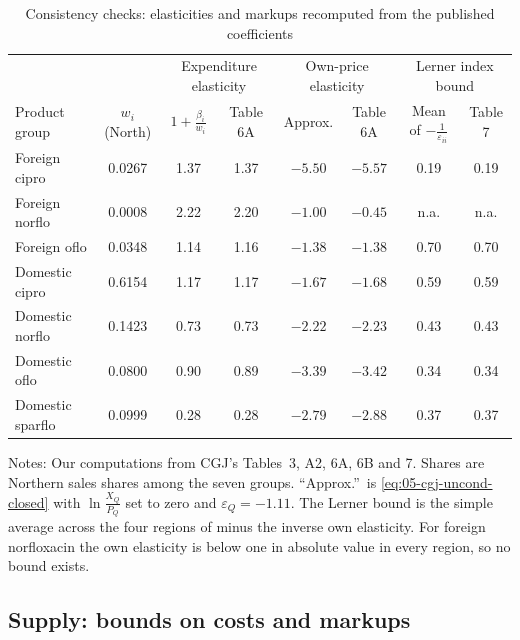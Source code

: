 \begin{table}[htbp]
\centering
\caption{Consistency checks: elasticities and markups recomputed from the published coefficients}\label{tab:05-cgj-checks}
\footnotesize
\setlength{\tabcolsep}{5pt}
\begin{tabular}{lccccccc}
\toprule
 & & \multicolumn{2}{c}{Expenditure elasticity} & \multicolumn{2}{c}{Own-price elasticity} & \multicolumn{2}{c}{Lerner index bound} \\
\cmidrule(lr){3-4}\cmidrule(lr){5-6}\cmidrule(lr){7-8}
Product group & \makecell{$w_i$\\ (North)} & $1 + \frac{\beta_i}{w_i}$ & Table 6A & Approx. & Table 6A &
\makecell{Mean of\\ $-\frac{1}{\varepsilon_{ii}}$} & Table 7 \\
\midrule
Foreign cipro & 0.0267 & 1.37 & 1.37 & $-5.50$ & $-5.57$ & 0.19 & 0.19 \\
Foreign norflo & 0.0008 & 2.22 & 2.20 & $-1.00$ & $-0.45$ & n.a. & n.a. \\
Foreign oflo & 0.0348 & 1.14 & 1.16 & $-1.38$ & $-1.38$ & 0.70 & 0.70 \\
Domestic cipro & 0.6154 & 1.17 & 1.17 & $-1.67$ & $-1.68$ & 0.59 & 0.59 \\
Domestic norflo & 0.1423 & 0.73 & 0.73 & $-2.22$ & $-2.23$ & 0.43 & 0.43 \\
Domestic oflo & 0.0800 & 0.90 & 0.89 & $-3.39$ & $-3.42$ & 0.34 & 0.34 \\
Domestic sparflo & 0.0999 & 0.28 & 0.28 & $-2.79$ & $-2.88$ & 0.37 & 0.37 \\
\bottomrule
\end{tabular}
\par\smallskip
\begin{minipage}{0.95\textwidth}\footnotesize
Notes: Our computations from CGJ's Tables~3, A2, 6A, 6B and 7. Shares are Northern sales shares among the seven
groups. ``Approx.''\ is \eqref{eq:05-cgj-uncond-closed} with $\ln\frac{X_Q}{P_Q}$ set to zero and $\varepsilon_Q =
-1.11$. The Lerner bound is the simple average across the four regions of minus the inverse own elasticity. For
foreign norfloxacin the own elasticity is below one in absolute value in every region, so no bound exists.
\end{minipage}
\end{table}

\subsection{Supply: bounds on costs and markups}\label{sec:05-cgj-supply}

